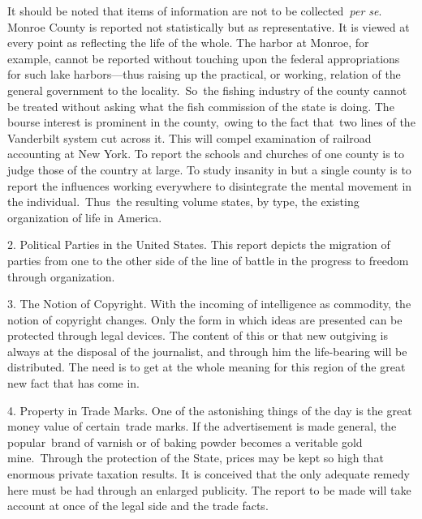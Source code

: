 \documentclass[openany,nobib]{tufte-book}
\begin{document}
It should be noted that items of information are not to be
collected\emph{~per se}. Monroe County is reported not statistically but
as representative. It is viewed at every point as reflecting the life of
the whole. The harbor at Monroe, for example, cannot be reported without
touching upon the federal appropriations for such lake harbors---thus
raising up the practical, or working, relation of the general government
to the locality.~So~the fishing industry of the county cannot be treated
without asking what the fish commission of the state is doing. The
bourse interest is prominent in the county,~owing to the fact that~two
lines of the Vanderbilt system cut across it. This will compel
examination of railroad accounting at New York. To report the schools
and churches of one county is to judge those of the country at large. To
study insanity in but a single county is to report the influences
working everywhere to disintegrate the mental movement in the
individual.~Thus~the resulting volume states, by type, the existing
organization of life in America.~

\vspace{.05in}

2. Political Parties in the United States. This report depicts the
migration of parties from one to the other side of the line of battle in
the progress to freedom through organization.~

\vspace{.05in}

3. The Notion of Copyright. With the incoming of intelligence as
commodity, the notion of copyright changes. Only the form in which ideas
are presented can be protected through legal devices. The content of
this or that new outgiving is always at the disposal of the journalist,
and through him the life-bearing will be distributed. The need is to get
at the whole meaning for this region of the great new fact that has come
in.~

\vspace{.05in}

4. Property in Trade Marks. One of the astonishing things of the day is
the great money value of certain~trade marks. If the advertisement is
made general, the popular~brand of varnish or of baking powder becomes a
veritable gold mine.~Through the protection of the State, prices may be
kept so high that enormous private taxation results. It is conceived
that the only adequate remedy here must be had through an enlarged
publicity. The report to be made will take account at once of the legal
side and the trade facts.~
\end{document}
